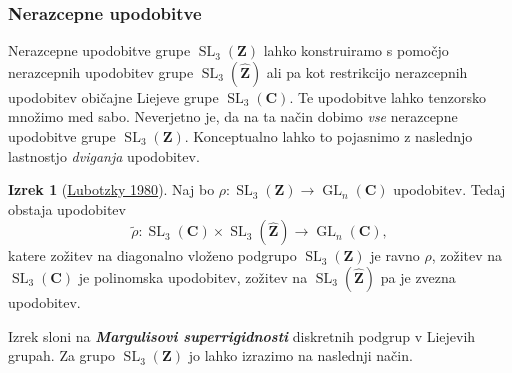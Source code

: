 \documentclass[11pt]{book}
\def\ZZ{\mathbf{Z}}
\def\CC{\mathbf{C}}
\DeclareMathOperator\GL{GL}
\DeclareMathOperator\SL{SL}
\def\definicija{\color{rdeca}\bf\em}
\theoremstyle{definition}
\theoremstyle{zgled}
\theoremstyle{odprtproblem}
\theoremstyle{domacanaloga}
\theoremstyle{izrek}
\newtheorem*{izrek}{Izrek}
\begin{document}
\subsubsection{Nerazcepne upodobitve}

Nerazcepne upodobitve grupe $\SL_3(\ZZ)$ lahko konstruiramo s pomočjo nerazcepnih upodobitev grupe $\SL_3(\widehat{\ZZ})$ ali pa kot restrikcijo nerazcepnih upodobitev običajne Liejeve grupe $\SL_3(\CC)$. Te upodobitve lahko tenzorsko množimo med sabo. Neverjetno je, da na ta način dobimo \emph{vse} nerazcepne upodobitve grupe $\SL_3(\ZZ)$. Konceptualno lahko to pojasnimo z naslednjo lastnostjo \emph{dviganja} upodobitev.

\begin{izrek}[\href{https://www.jstor.org/stable/2374092}{Lubotzky 1980}]
Naj bo $\rho \colon \SL_3(\ZZ) \to \GL_n(\CC)$ upodobitev. Tedaj obstaja upodobitev
\[
    \textstyle \tilde \rho \colon \SL_3(\CC) \times \SL_3(\widehat{\ZZ}) \to \GL_n(\CC),  
\]
katere zožitev na diagonalno vloženo podgrupo $\SL_3(\ZZ)$ je ravno $\rho$, zožitev na $\SL_3(\CC)$ je polinomska upodobitev, zožitev na $\SL_3(\widehat{\ZZ})$ pa je zvezna upodobitev.
\end{izrek}

Izrek sloni na {\definicija Margulisovi superrigidnosti} diskretnih podgrup v Liejevih grupah. Za grupo $\SL_3(\ZZ)$ jo lahko izrazimo na naslednji način.
\end{document}
